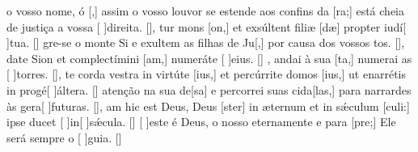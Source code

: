 {    { o vosso nome, ó [,] assim o vosso louvor se estende aos confins da [ra;] está cheia de justiça a vossa [ ]{di}{rei}ta. [\LinkPT]},
  {tur mons [on,] et exsúltent filiæ [dæ] propter iudí[ ]{tu}a. [\LinkLA]}%
    {gre-se o monte Si e exultem as filhas de Ju[,] por causa dos vossos \-tos. [\LinkPT]},
  {date Sion et complectímini [am,] numeráte [ ]{e}ius. [\LinkLA]}%
    {, andai à sua [ta,] numerai as [ ]{tor}res. [\LinkPT]},
  {te corda vestra in virtúte [ius,] et percúrrite domos [ius,] ut enarrétis in progé[ ]{ál}tera. [\LinkLA]}%
    { atenção na sua de[sa] e percorrei suas cida\-[\-las,] para narrardes às gera[ ]{fu}{tu}ras. [\LinkPT]},
  {am hic est Deus, Deus [ster] in æternum et in sǽculum [culi:] ipse ducet [ ]{in}[ ]{sǽ}cula. [\LinkLA]}%
    {[ ]{es}te é Deus, o nosso  eternamente e para [\-pre;] Ele será sempre o [ ]{gui}a. [\LinkPT]}
}